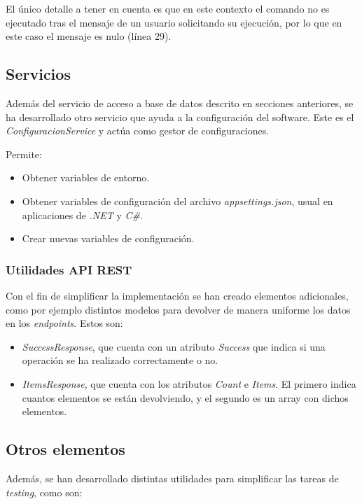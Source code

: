 El único detalle a tener en cuenta es que en este contexto el comando no es ejecutado tras el mensaje de un usuario solicitando su ejecución, por lo que en este caso el mensaje es nulo (línea 29).


\subsection{Servicios}

Además del servicio de acceso a base de datos descrito en secciones anteriores, se ha desarrollado otro servicio que ayuda a la configuración del software. Este es el \textit{ConfiguracionService} y actúa como gestor de configuraciones.

Permite:

\begin{itemize}
	\item Obtener variables de entorno.
	\item Obtener variables de configuración del archivo \textit{appsettings.json}, usual en aplicaciones de \textit{.NET} y \textit{C\#}.
	\item Crear nuevas variables de configuración.
\end{itemize}


\subsubsection{Utilidades API REST}

Con el fin de simplificar la implementación se han creado elementos adicionales, como por ejemplo distintos modelos para devolver de manera uniforme los datos en los \textit{endpoints}. Estos son:

\begin{itemize}
	\item \textit{SuccessResponse}, que cuenta con un atributo \textit{Success} que indica si una operación se ha realizado correctamente o no.
	\item \textit{ItemsResponse}, que cuenta con los atributos \textit{Count} e \textit{Items}. El primero indica cuantos elementos se están devolviendo, y el segundo es un array con dichos elementos.
\end{itemize}


\subsection{Otros elementos}

Además, se han desarrollado distintas utilidades para simplificar las tareas de \textit{testing}, como son:

